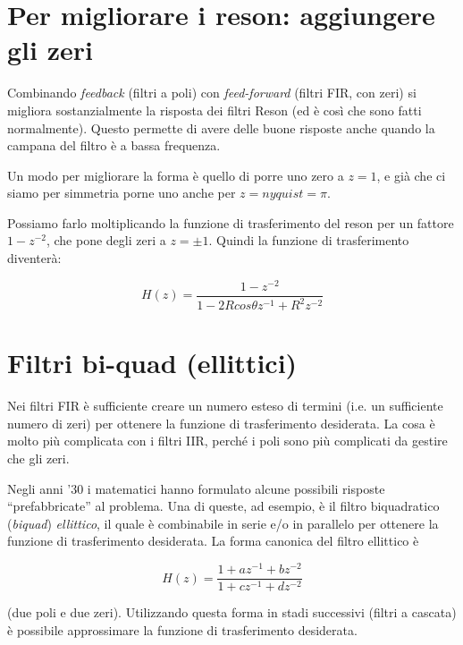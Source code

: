 \section{Per migliorare i reson: aggiungere gli zeri}

Combinando \emph{feedback} (filtri a poli) con \emph{feed-forward} (filtri
FIR, con zeri) si migliora sostanzialmente la risposta dei filtri Reson
(ed è così che sono fatti normalmente). Questo permette di avere delle buone
risposte anche quando la campana del filtro \`e a bassa frequenza.

Un modo per migliorare la forma \`e quello di porre uno zero a $z = 1$, e
gi\`a che ci siamo per simmetria porne uno anche per $z = nyquist = \pi$.

Possiamo farlo moltiplicando la funzione di trasferimento del reson per un
fattore $1 - z^{-2}$, che pone degli zeri a $z = \pm 1$. Quindi la
funzione di trasferimento diventer\`a:

\begin{equation}
	H(z) = \frac{1 - z^{-2}}{1 - 2 R cos \theta z^{-1} + R^2 z^{-2}}
\end{equation}

\section{Filtri bi-quad (ellittici)}

Nei filtri FIR \`e sufficiente creare un numero esteso di termini (i.e. un
sufficiente numero di zeri) per ottenere la funzione di trasferimento
desiderata. La cosa \`e molto pi\`u complicata con i filtri IIR,
perch\'e i
poli sono pi\`u complicati da gestire che gli zeri.

Negli anni '30 i matematici hanno formulato alcune possibili risposte
``prefabbricate'' al problema. Una di queste, ad esempio, \`e il filtro
biquadratico (\emph{biquad}) \emph{ellittico}, il quale \`e combinabile in
serie e/o in parallelo per ottenere la funzione di trasferimento desiderata.
La forma canonica del filtro ellittico \`e

\begin{equation}
	H ( z ) = \frac{1 + a z^{-1} + b z^{-2}}{1 + c z^{-1} + d z^{-2}}	
\end{equation}

(due poli e due zeri).
Utilizzando questa forma in stadi successivi (filtri a cascata) \`e possibile
approssimare la funzione di trasferimento desiderata.
%
